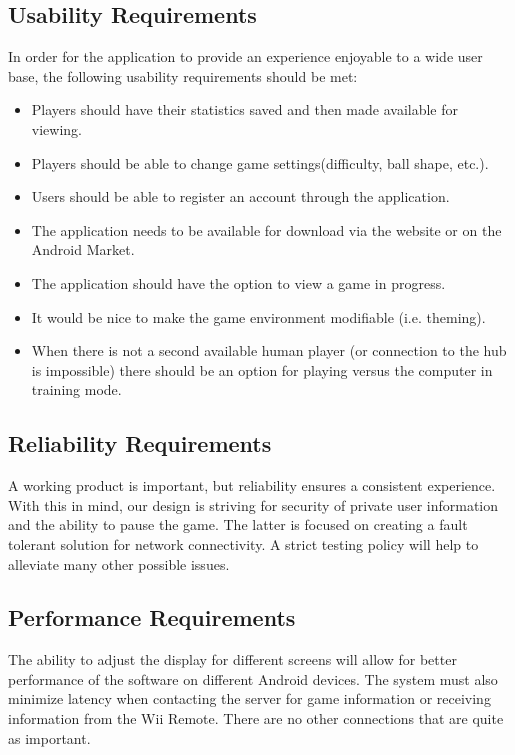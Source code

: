 \documentclass[12pt]{article}
\begin{document}


\subsection{Usability Requirements}
In order for the application to provide an experience enjoyable to a wide user base, the following usability requirements should be met:
\begin{itemize}
\item Players should have their statistics saved and then made available for viewing.
\item Players should be able to change game settings(difficulty, ball shape, etc.).
\item Users should be able to register an account through the application.
\item The application needs to be available for download via the website or on the Android Market.
\item The application should have the option to view a game in progress.
\item It would be nice to make the game environment modifiable (i.e. theming).
\item When there is not a second available human player (or connection to the hub is impossible) there should be an option for playing versus the computer in training mode.
\end{itemize}

\subsection{Reliability Requirements}
A working product is important, but reliability ensures a consistent experience.  With this in mind, our design is striving for security of private user information and the ability to pause the game.  The latter is focused on creating a fault tolerant solution for network connectivity.  A strict testing policy will help to alleviate many other possible issues.

\subsection{Performance Requirements}
The ability to adjust the display for different screens will allow for better performance of the software on different Android devices.  The system must also minimize latency when contacting the server for game information or receiving information from the Wii Remote.  There are no other connections that are quite as important.
\end{document}

